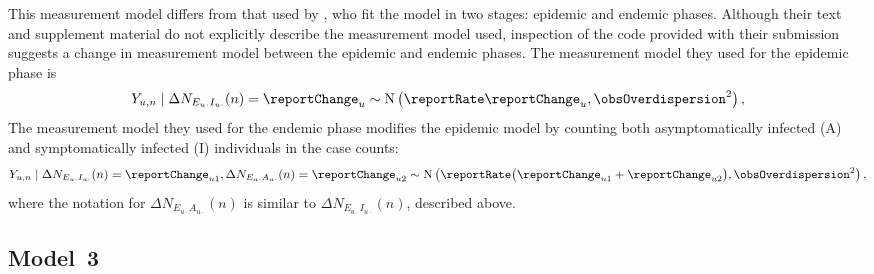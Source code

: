 This measurement model differs from that used by \citet{lee20}, who fit the model in two stages: epidemic and endemic phases.
Although their text and supplement material do not explicitly describe the measurement model used, inspection of the code provided with their submission suggests a change in measurement model between the epidemic and endemic phases.
The measurement model they used for the epidemic phase is
\begin{equation}
  \label{model2:measEpi}
  Y_{u, n} \mid \Delta N_{E_{u\cdot}I_{u\cdot}}(n) = \reportChange_u \sim \text{N}\left(\reportRate \reportChange_u, \obsOverdispersion^2 \right),
\end{equation}
The measurement model they used for the endemic phase modifies the epidemic model by counting both asymptomatically infected (A) and symptomatically infected (I) individuals in the case counts:
\begin{equation}
  \label{model2:measEnd}
  Y_{u, n} \mid \Delta N_{E_{u\cdot}I_{u\cdot}}(n) = \reportChange_{u1}, \Delta N_{E_{u\cdot}A_{u\cdot}}(n) = \reportChange_{u2} \sim \text{N}\left(\reportRate \big(\reportChange_{u1} + \reportChange_{u2}\big), \obsOverdispersion^2 \right),
\end{equation}
where the notation for $\Delta N_{E_{u\cdot}A_{u\cdot}}(n)$ is similar to $\Delta N_{E_{u\cdot}I_{u\cdot}}(n)$, described above.

\subsection{Model~3}

